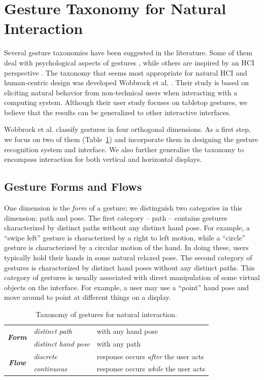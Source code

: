 \section{Gesture Taxonomy for Natural Interaction}\label{sec:taxonomy}
Several gesture taxonomies have been suggested in the literature. Some of them
deal with psychological aspects of gestures \cite{kendon86, mcneill82}, while
others are inspired by an HCI perspective \cite{quek94,
quek95, Pavlovic97}. The taxonomy that seems most appropriate for natural HCI
and human-centric design was developed Wobbrock et al. \cite{wobbrock09}. Their
study is based on eliciting natural behavior from non-technical users when
interacting with a computing system. Although their user study focuses on
tabletop gestures, we believe that the results can be generalized to other
interactive interfaces. 

Wobbrock et al. classify gestures in four orthogonal dimensions. As a first
step, we focus on two of them (Table~\ref{tab:taxonomy}) and incorporate them in
designing the gesture recognition system and interface. We also further generalize the
taxonomy to encompass interaction for both vertical and horizontal displays.

\subsection{Gesture Forms and Flows}
One dimension is the \textit{form} of a gesture; we distinguish two
categories in this dimension: path and pose. The first category -- path --
contains gestures characterized by distinct paths without any distinct
hand pose. For example, a ``swipe left'' gesture is characterized by a
right to left motion, while a ``circle'' gesture is characterized by a
circular motion of the hand. In doing these, users typically hold their
hands in some natural relaxed pose. The second category of gestures is
characterized by distinct hand poses without any distinct paths. This category
of gestures is usually associated with direct manipulation of some virtual
objects on the interface.
For example, a user may use a ``point'' hand pose and move around to
point at different things on a display.

\begin{table}[t]
\caption{Taxonomy of gestures for natural interaction.}
\label{tab:taxonomy}
\centering
\begin{tabular}{|c|l|l|}
\hline
\multirow{2}{*}{\textbf{\textit{Form}}} & \textit{distinct path} & with any hand
pose
\\
\cline{2-3} 
                               & \textit{distinct hand pose} & with any path \\
\hline
\multirow{2}{*}{\textbf{\textit{Flow}}} & \textit{discrete} & response occurs
\textit{after} the user acts \\
\cline{2-3}
              & \textit{continuous} & response occurs \textit{while} the user
              acts \\
\hline
\end{tabular}
\end{table}

